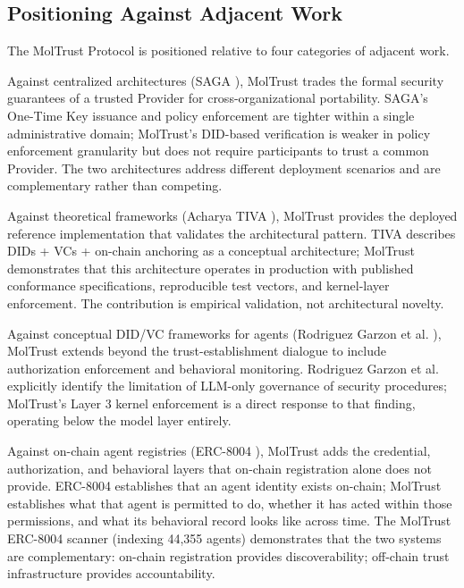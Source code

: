 \subsection{Positioning Against Adjacent Work}

The MolTrust Protocol is positioned relative to four categories of adjacent work.


Against centralized architectures (SAGA \cite{ref16_syros}), MolTrust trades the formal security guarantees of a trusted Provider for cross-organizational portability. SAGA's One-Time Key issuance and policy enforcement are tighter within a single administrative domain; MolTrust's DID-based verification is weaker in policy enforcement granularity but does not require participants to trust a common Provider. The two architectures address different deployment scenarios and are complementary rather than competing.


Against theoretical frameworks (Acharya TIVA \cite{ref17_acharya}), MolTrust provides the deployed reference implementation that validates the architectural pattern. TIVA describes DIDs + VCs + on-chain anchoring as a conceptual architecture; MolTrust demonstrates that this architecture operates in production with published conformance specifications, reproducible test vectors, and kernel-layer enforcement. The contribution is empirical validation, not architectural novelty.


Against conceptual DID/VC frameworks for agents (Rodriguez Garzon et al. \cite{ref36_rodriguezgarzon}), MolTrust extends beyond the trust-establishment dialogue to include authorization enforcement and behavioral monitoring. Rodriguez Garzon et al. explicitly identify the limitation of LLM-only governance of security procedures; MolTrust's Layer 3 kernel enforcement is a direct response to that finding, operating below the model layer entirely.


Against on-chain agent registries (ERC-8004 \cite{ref37_erc8004}), MolTrust adds the credential, authorization, and behavioral layers that on-chain registration alone does not provide. ERC-8004 establishes that an agent identity exists on-chain; MolTrust establishes what that agent is permitted to do, whether it has acted within those permissions, and what its behavioral record looks like across time. The MolTrust ERC-8004 scanner (indexing 44,355 agents) demonstrates that the two systems are complementary: on-chain registration provides discoverability; off-chain trust infrastructure provides accountability.


